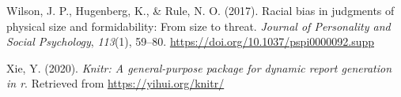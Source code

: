 \documentclass[
  english,
  man, noextraspace,floatsintext]{apa6}
\newlength{\cslhangindent}
\newenvironment{cslreferences}%
  {\setlength{\parindent}{0pt}%
  \everypar{\setlength{\hangindent}{\cslhangindent}}\ignorespaces}%
  {\par}
\begin{document}
\begin{cslreferences}
\leavevmode\hypertarget{ref-Wilson2017}{}%
Wilson, J. P., Hugenberg, K., \& Rule, N. O. (2017). Racial bias in judgments of physical size and formidability: From size to threat. \emph{Journal of Personality and Social Psychology}, \emph{113}(1), 59--80. \url{https://doi.org/10.1037/pspi0000092.supp}

\leavevmode\hypertarget{ref-R-knitr}{}%
Xie, Y. (2020). \emph{Knitr: A general-purpose package for dynamic report generation in r}. Retrieved from \url{https://yihui.org/knitr/}
\end{cslreferences}
\end{document}
